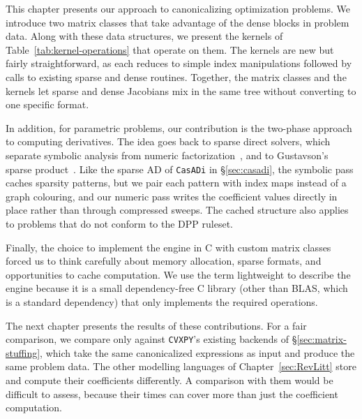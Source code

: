This chapter presents our approach to canonicalizing
optimization problems. We introduce two matrix classes that take
advantage of the dense blocks in problem data. Along with these data structures, we
present the kernels of Table~\ref{tab:kernel-operations} that operate on them. The
kernels are new but fairly straightforward, as each reduces to simple index manipulations
followed by calls to existing sparse and dense routines. Together, the matrix classes
and the kernels let sparse and dense Jacobians mix in the same tree without converting
to one specific format.

In addition, for parametric problems, our contribution is the two-phase approach to computing
derivatives. The idea goes back to sparse direct solvers, which separate symbolic analysis
from numeric factorization~\cite{davis2006direct}, and to Gustavson's sparse
product~\cite{gustavson1978two}. Like the sparse \ac{AD} of \texttt{CasADi}
in \S\ref{sec:casadi}, the symbolic pass caches sparsity patterns, but we pair each pattern
with index maps instead of a graph colouring, and our numeric pass writes the coefficient
values directly in place rather than through compressed sweeps.
The cached structure also applies to problems that do not conform to the
\ac{DPP} ruleset.

Finally, the choice to implement the engine in C with custom matrix classes forced us to
think carefully about memory allocation, sparse formats, and opportunities to cache
computation. We use the term
lightweight to describe the engine because it is a small dependency-free C library
(other than BLAS, which is a standard dependency) that only implements the required
operations. 

The next chapter presents the results of these contributions. For a fair
comparison, we compare only against \texttt{CVXPY}'s existing backends of
\S\ref{sec:matrix-stuffing}, which take the same canonicalized expressions as input and
produce the same problem data. The other modelling languages of
Chapter~\ref{sec:RevLitt} store and compute their coefficients differently. A comparison
with them would be difficult to assess, because their times can cover more than just the
coefficient computation.
